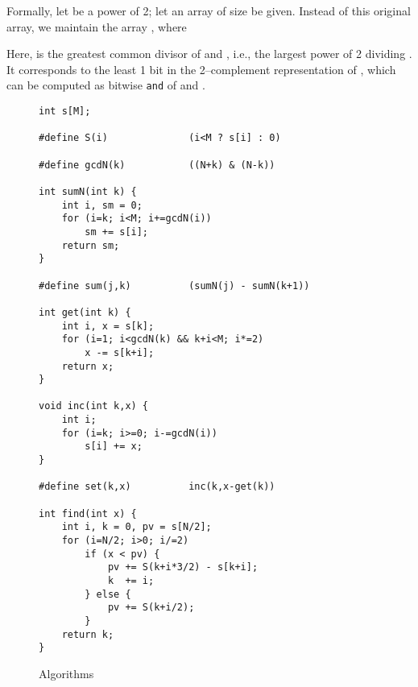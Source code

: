 \documentclass{elsartNoFoot}
\newcommand{\1}{\color{red}}
\newcommand{\2}{\color{green}}
\newcommand{\+}[3]{{\renewcommand{\i}{{#1}}{#3},\ldots,\renewcommand{\i}{{#2}}{#3}}}
\begin{document}
Formally, let  be a power of 2;
let an array  of size  be given.
Instead of this original array, 
we maintain the array ,
where



Here,  is 
the greatest common divisor of  and , i.e.,
the largest power of 2 dividing .
It corresponds to the least 1 bit in the 2--complement
representation of , which can be computed as bitwise {\tt and}
of  and .



\begin{figure}
\begin{center}
\begin{verbatim}
int s[M];

#define S(i)              (i<M ? s[i] : 0)

#define gcdN(k)           ((N+k) & (N-k))

int sumN(int k) {
    int i, sm = 0;
    for (i=k; i<M; i+=gcdN(i))
        sm += s[i];
    return sm;
}

#define sum(j,k)          (sumN(j) - sumN(k+1))

int get(int k) {
    int i, x = s[k];
    for (i=1; i<gcdN(k) && k+i<M; i*=2)
        x -= s[k+i];
    return x;
}

void inc(int k,x) {
    int i;
    for (i=k; i>=0; i-=gcdN(i))
        s[i] += x;
}

#define set(k,x)          inc(k,x-get(k))

int find(int x) {
    int i, k = 0, pv = s[N/2];
    for (i=N/2; i>0; i/=2)
        if (x < pv) {
            pv += S(k+i*3/2) - s[k+i];
            k  += i;
        } else {
            pv += S(k+i/2);
        }
    return k;
}
\end{verbatim}
\caption{Algorithms}
\label{Algorithms}
\end{center}
\end{figure}
\end{document}
